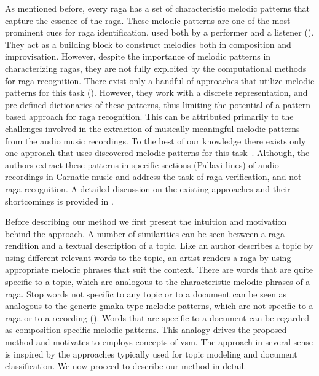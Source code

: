 As mentioned before, every \gls{raga} has a set of characteristic melodic patterns that capture the essence of the \gls{raga}. These melodic patterns are one of the most prominent cues for \gls{raga} identification, used both by a performer and a listener (). They act as a building block to construct melodies both in composition and improvisation. However, despite the importance of melodic patterns in characterizing \glspl{raga}, they are not fully exploited by the computational methods for \gls{raga} recognition.  There exist only a handful of approaches that utilize melodic patterns for this task (). However, they work with a discrete representation, and pre-defined dictionaries of these patterns, thus limiting the potential of a pattern-based approach for \gls{raga} recognition. This can be attributed primarily to the challenges involved in the extraction of musically meaningful melodic patterns from the audio music recordings. To the best of our knowledge there exists only one approach that uses discovered melodic patterns for this task~\citep{shrey_ISMIR_2015}. Although, the authors extract these patterns in specific sections (Pallavi lines) of audio recordings in Carnatic music and address the task of \gls{raga} verification, and not \gls{raga} recognition. A detailed discussion on the existing approaches and their shortcomings is provided in .

Before describing our method we first present the intuition and motivation behind the approach. A number of similarities can be seen between a \gls{raga} rendition and a textual description of a topic. Like an author describes a topic by using different relevant words to the topic, an artist renders a \gls{raga} by using appropriate melodic phrases that suit the context. There are words that are quite specific to a topic, which are analogous to the characteristic melodic phrases of a \gls{raga}. Stop words not specific to any topic or to a document can be seen as analogous to the generic \gls{gmaka} type melodic patterns, which are not specific to a \gls{raga} or to a recording (). Words that are specific to a document can be regarded as composition specific melodic patterns. This analogy drives the proposed method and motivates to employs concepts of \gls{vsm}. The approach in several sense is inspired by the approaches typically used for topic modeling and document classification. We now proceed to describe our method in detail.

